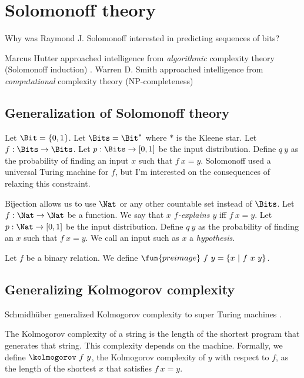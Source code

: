\chapter{Solomonoff theory}

Why was Raymond J. Solomonoff \cite{SolAlpProb2011, GacsVitanyiSolomonoff}
interested in predicting sequences of bits?

Marcus Hutter approached intelligence from \emph{algorithmic} complexity theory (Solomonoff induction)
\cite{DefineMachIntel}.
Warren D. Smith approached intelligence from \emph{computational} complexity theory
(NP-completeness)
\cite{WdsIntel, WdsIntelSlide}

\section{Generalization of Solomonoff theory}

Let \(\Bit = \{0,1\}\).
Let \(\Bits = \Bit^*\) where \(*\) is the Kleene star.
Let \(f : \Bits \to \Bits\).
Let \(p : \Bits \to [0,1]\) be the input distribution.
Define \(q~y\) as the probability of finding an input \(x\) such that \(f~x = y\).
Solomonoff used a universal Turing machine for \(f\),
but I'm interested on the consequences of relaxing this constraint.

Bijection allows us to use \(\Nat\) or any other countable set instead of \(\Bits\).
Let \(f : \Nat \to \Nat\) be a function.
We say that \emph{\(x\) \(f\)-explains \(y\)} iff \(f~x = y\).
Let \(p : \Nat \to [0,1]\) be the input distribution.
Define \(q~y\) as the probability of finding an \(x\) such that \(f~x = y\).
We call an input such as \(x\) a \emph{hypothesis}.

\newcommand\preimage{\fun{preimage}}

Let \(f\) be a binary relation.
We define \(\preimage~f~y = \{ x ~|~ f~x~y \}\).

\section{Generalizing Kolmogorov complexity}

Schmidh\"uber generalized Kolmogorov complexity to super Turing machines \cite{SchmidhuberKolmogorov}.

The Kolmogorov complexity of a string
is the length of the shortest program that generates that string.
This complexity depends on the machine.
Formally, we define \(\kolmogorov~f~y\),
the Kolmogorov complexity of \(y\) with respect to \(f\),
as the length of the shortest \(x\) that satisfies \(f~x = y\).

